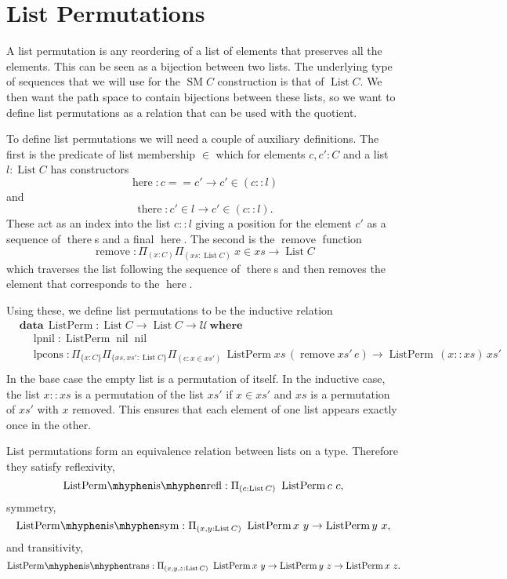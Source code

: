 \documentclass[12pt, parskip, DIV=14]{scrbook}
\newcommand{\SM}{\operatorname{SM}}
\newcommand{\List}{\operatorname{List}}
\newcommand{\here}{\operatorname{here}}
\newcommand{\there}{\operatorname{there}}
\newcommand{\ListPerm}{\operatorname{ListPerm}}
\newcommand{\remove}{\operatorname{remove}}
\newcommand{\lpnil}{\operatorname{lpnil}}
\newcommand{\lpcons}{\operatorname{lpcons}}
\newcommand{\nil}{\operatorname{nil}}
\begin{document}
\section{List Permutations}

A list permutation is any reordering of a list of elements that preserves all the elements. This can be seen as a bijection between two lists. The underlying type of sequences that we will use for the $\SM C$ construction is that of $\List C$. We then want the path space to contain bijections between these lists, so we want to define list permutations as a relation that can be used with the quotient.

To define list permutations we will need a couple of auxiliary definitions. The first is the predicate of list membership $\in$ which for elements $c , c' : C$ and a list $l : \List C$ has constructors
$$\here : c == c' \to c' \in (c :: l)$$
and
$$\there : c' \in l \to c' \in (c :: l).$$
These act as an index into the list $c :: l$ giving a position for the element $c'$ as a sequence of $\there$s and a final $\here$. The second is the $\remove$ function
$$\remove : \Pi_{(x : C)}\Pi_{(xs : \List C)}~x \in xs \to \List C$$
which traverses the list following the sequence of $\there$s and then removes the element that corresponds to the $\here$.

Using these, we define list permutations to be the inductive relation
\begin{align*}
&\mathbf{data}\,\ListPerm : \List C \to \List C \to \mathcal{U}\,\mathbf{where} \\
  &\quad\lpnil : \ListPerm \nil \nil \\
  &\quad\lpcons : \Pi_{\{x : C\}}\Pi_{\{xs , xs' : \List C\}}\Pi_{(e : x \in xs')}\,\ListPerm xs\,(\remove xs'\,e) \to \ListPerm\,(x :: xs)\,xs' \\
\end{align*}
In the base case the empty list is a permutation of itself. In the inductive case, the list $x :: xs$ is a permutation of the list $xs'$ if $x \in xs'$ and $xs$ is a permutation of $xs'$ with $x$ removed. This ensures that each element of one list appears exactly once in the other.

List permutations form an equivalence relation between lists on a type. Therefore they satisfy reflexivity,
$$\mathrm{ListPerm\mhyphen is\mhyphen refl} : \Pi_{(c : \List C)}~\ListPerm c~c,$$
symmetry,
$$\mathrm{ListPerm\mhyphen is\mhyphen sym} : \Pi_{(x , y : \List C)}~\ListPerm x~y \to \ListPerm y~x,$$
and transitivity,
$$\mathrm{ListPerm\mhyphen is\mhyphen trans} : \Pi_{(x , y , z : \List C)}~\ListPerm x~y \to \ListPerm y~z \to \ListPerm x~z.$$
\end{document}
